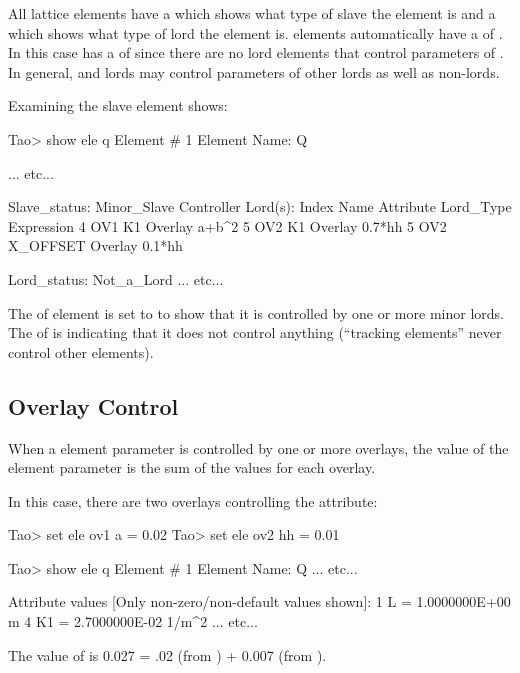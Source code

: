 \documentclass{hitec}
\begin{document}
All lattice elements have a  which shows what type of slave the element is and a
 which shows what type of lord the element is.  elements automatically
have a  of . In this case  has a  of
 since there are no lord elements that control parameters of . In general,
 and  lords may control parameters of other lords as well as non-lords.

Examining the  slave element shows:
\begin{code}
Tao> show ele q
 Element #                1
 Element Name: Q

        ... etc...

Slave_status: Minor_Slave
Controller Lord(s):
   Index   Name        Attribute           Lord_Type           Expression
       4   OV1         K1                  Overlay             a+b^2
       5   OV2         K1                  Overlay             0.7*hh
       5   OV2         X_OFFSET            Overlay             0.1*hh

Lord_status:  Not_a_Lord
        ... etc...
\end{code}

The  of element  is set to  to show that it is controlled by
one or more minor lords. The  of  is  indicating that it does not
control anything (``tracking elements'' never control other elements).

\subsection{Overlay Control}

When a element parameter is controlled by one or more overlays, the value of the element parameter
is the sum of the values for each overlay.

In this case, there are two overlays controlling the  attribute:
\begin{code}
Tao> set ele ov1 a = 0.02
Tao> set ele ov2 hh = 0.01

Tao> show ele q
 Element #                1
 Element Name: Q
... etc...

 Attribute values [Only non-zero/non-default values shown]:
    1   L                            =  1.0000000E+00 m
    4   K1                           =  2.7000000E-02 1/m^2
... etc...
\end{code}
The value of  is 0.027 = .02 (from ) + 0.007 (from ).
\end{document}
